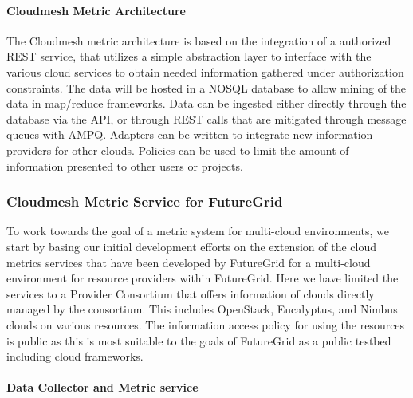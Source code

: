 \documentclass{tex/sig-alternate-2013}
\newcommand{\todo}[1]{{\color{red}{#1}}}
\begin{document}
{\paragraph{Cloudmesh Metric Architecture}

\todo{READ}

The Cloudmesh metric architecture is based on the integration of a authorized REST service, that utilizes a simple abstraction layer to interface with the various cloud services to obtain needed information gathered under authorization constraints. The data will be hosted in a NOSQL database to allow mining of the data in map/reduce frameworks. Data can be ingested either directly through the database via the API, or through REST calls that are mitigated through message queues with AMPQ. Adapters can be written to integrate new information providers for other clouds. Policies can be used to limit the amount of information presented to other users or projects.

\subsubsection{Cloudmesh Metric Service for FutureGrid}

\todo{READ}

To work towards the goal of a metric system for multi-cloud environments, we start by basing our initial development efforts on the extension of the cloud metrics services that have been developed by FutureGrid for a multi-cloud environment for resource providers within FutureGrid. Here we have limited the services to a Provider Consortium that offers information of clouds directly managed by the consortium. This includes OpenStack, Eucalyptus, and Nimbus clouds on various resources. The information access policy for using the resources is public as this is most suitable to the goals of FutureGrid as a public testbed including cloud frameworks.

\paragraph{Data Collector and Metric service}

\todo{READ}


}
\end{document}
